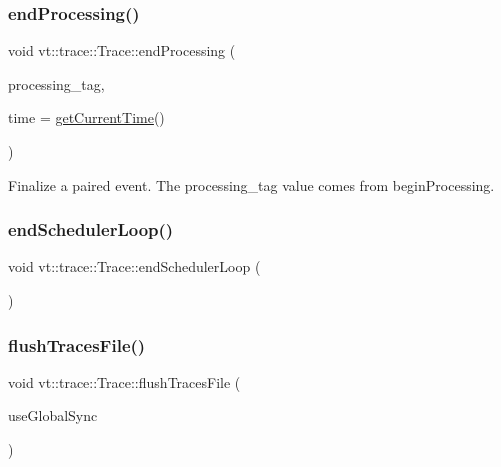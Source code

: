 \mbox{\label{structvt_1_1trace_1_1_trace_a18f66e844acc133fce37c2c9d9f939e0}} 
\subsubsection{\texorpdfstring{end\+Processing()}{endProcessing()}}
{\footnotesize\ttfamily void vt\+::trace\+::\+Trace\+::end\+Processing (\begin{DoxyParamCaption}\item[{\hyperlink{structvt_1_1trace_1_1_trace_processing_tag}{Trace\+Processing\+Tag} const \&}]{processing\+\_\+tag,  }\item[{double const}]{time = {\ttfamily \hyperlink{structvt_1_1trace_1_1_trace_a04cf6b76b4ced1bc90d246a34c948db5}{get\+Current\+Time}()} }\end{DoxyParamCaption})}

Finalize a paired event. The processing\+\_\+tag value comes from begin\+Processing. \mbox{\label{structvt_1_1trace_1_1_trace_ad7ee4fc8c75874a524ce7cc1501209fd}} 
\subsubsection{\texorpdfstring{end\+Scheduler\+Loop()}{endSchedulerLoop()}}
{\footnotesize\ttfamily void vt\+::trace\+::\+Trace\+::end\+Scheduler\+Loop (\begin{DoxyParamCaption}{ }\end{DoxyParamCaption})}

\mbox{\label{structvt_1_1trace_1_1_trace_a2e07094a48c47b9c591003f0b57305c7}} 
\subsubsection{\texorpdfstring{flush\+Traces\+File()}{flushTracesFile()}}
{\footnotesize\ttfamily void vt\+::trace\+::\+Trace\+::flush\+Traces\+File (\begin{DoxyParamCaption}\item[{bool}]{use\+Global\+Sync }\end{DoxyParamCaption})}

